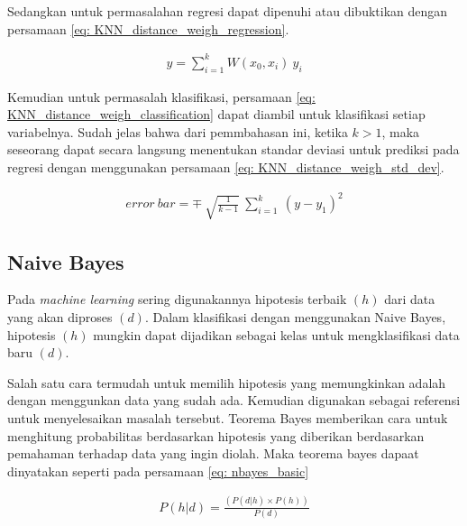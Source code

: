 \begin{enumerate}[label=\textbf{\alph*).}]
	Sedangkan untuk permasalahan regresi dapat dipenuhi atau dibuktikan dengan persamaan \ref{eq: KNN_distance_weigh_regression}.
	
	\begin{equation}\label{eq: KNN_distance_weigh_regression}
	\begin{split}
	y = \sum_{i = 1}^{k} W(x_{0}, x_{i})\ y_{i}
	\end{split}
	\end{equation}
	
	Kemudian untuk permasalah klasifikasi, persamaan \ref{eq: KNN_distance_weigh_classification} dapat diambil untuk klasifikasi setiap variabelnya. Sudah jelas bahwa dari pemmbahasan ini, ketika $k > 1$, maka seseorang dapat secara langsung menentukan standar deviasi untuk prediksi pada regresi dengan menggunakan persamaan \ref{eq: KNN_distance_weigh_std_dev}.
	
	\begin{equation}\label{eq: KNN_distance_weigh_std_dev}
	\begin{split}
	error\ bar = \mp\ \sqrt{\frac{1}{k - 1}}\ \sum_{i = 1}^{k}\ (y - y_{1})^2
	\end{split}
	\end{equation}
\end{enumerate}

\subsection{Naive Bayes}
\label{sec:sub_sec2_bayes}
\vspace{1ex}

Pada \textit{machine learning} sering digunakannya hipotesis terbaik $(h)$ dari data yang akan diproses $(d)$. Dalam klasifikasi dengan menggunakan Naive Bayes, hipotesis $(h)$ mungkin dapat dijadikan sebagai kelas untuk mengklasifikasi data baru $(d)$.
\vspace{1ex}

Salah satu cara termudah untuk memilih hipotesis yang memungkinkan adalah dengan menggunkan data yang sudah ada. Kemudian digunakan sebagai referensi untuk menyelesaikan masalah tersebut. Teorema Bayes memberikan cara untuk menghitung probabilitas berdasarkan hipotesis yang diberikan berdasarkan pemahaman terhadap data yang ingin diolah. Maka teorema bayes dapaat dinyatakan seperti pada persamaan \ref{eq: nbayes_basic}

\begin{equation}\label{eq: nbayes_basic}
\begin{split}
P(h|d) = \frac{(P(d|h) \times P(h))}{P(d)}
\end{split}
\end{equation}

